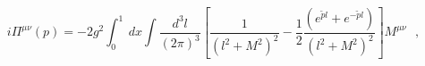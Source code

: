 \begin{equation}
i\Pi^{\mu\nu}(p) = - 2 g^2 \int _{0}^{1} ~dx \int
\frac{d^3l}{(2\pi)^3}[\frac {1}{(l^2 + M^2)^2} - \frac{1}{2} \frac { (
e^{\tilde p l} + e^{-\tilde p l} )}{(l^2 + M^2)^2} ]{\mathit {M}
}^{\mu\nu} ~~~,
\end{equation}


